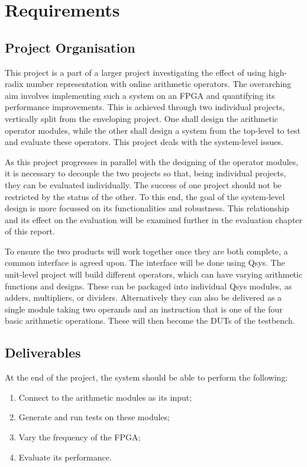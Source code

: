 \section{Requirements}

\subsection{Project Organisation}
This project is a part of a larger project investigating the effect of using high-radix number representation with online arithmetic operators.
The overarching aim involves implementing such a system on an FPGA and quantifying its performance improvements.
This is achieved through two individual projects, vertically split from the enveloping project.
One shall design the arithmetic operator modules, while the other shall design a system from the top-level to test and evaluate these operators.
This project deals with the system-level issues.

As this project progresses in parallel with the designing of the operator modules, it is necessary to decouple the two projects so that, being individual projects, they can be evaluated individually.
The success of one project should not be restricted by the status of the other.
To this end, the goal of the system-level design is more focussed on its functionalities and robustness.
This relationship and its effect on the evaluation will be examined further in the evaluation chapter of this report.

To ensure the two products will work together once they are both complete, a common interface is agreed upon.
The interface will be done using Qsys.
The unit-level project will build different operators, which can have varying arithmetic functions and designs.
These can be packaged into individual Qsys modules, as adders, multipliers, or dividers.
Alternatively they can also be delivered as a single module taking two operands and an instruction that is one of the four basic arithmetic operations.
These will then become the DUTs of the testbench.

\subsection{Deliverables}
At the end of the project, the system should be able to perform the following:
\begin{enumerate}
  \item Connect to the arithmetic modules as its input;
  \item Generate and run tests on these modules;
  \item Vary the frequency of the FPGA;
  \item Evaluate its performance.
\end{enumerate}

